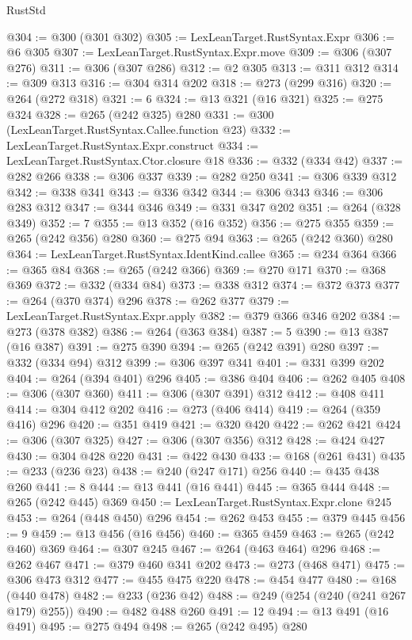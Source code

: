 \begin{lexlean}{RustStd}
\begin{coremodule}
@304 := @300 (@301 @302)
@305 := LexLeanTarget.RustSyntax.Expr
@306 := @6 @305
@307 := LexLeanTarget.RustSyntax.Expr.move
@309 := @306 (@307 @276)
@311 := @306 (@307 @286)
@312 := @2 @305
@313 := @311 @312
@314 := @309 @313
@316 := @304 @314 @202
@318 := @273 (@299 @316)
@320 := @264 (@272 @318)
@321 := 6
@324 := @13 @321 (@16 @321)
@325 := @275 @324
@328 := @265 (@242 @325) @280
@331 := @300 (LexLeanTarget.RustSyntax.Callee.function @23)
@332 := LexLeanTarget.RustSyntax.Expr.construct
@334 := LexLeanTarget.RustSyntax.Ctor.closure @18
@336 := @332 (@334 @42)
@337 := @282 @266
@338 := @306 @337
@339 := @282 @250
@341 := @306 @339 @312
@342 := @338 @341
@343 := @336 @342
@344 := @306 @343
@346 := @306 @283 @312
@347 := @344 @346
@349 := @331 @347 @202
@351 := @264 (@328 @349)
@352 := 7
@355 := @13 @352 (@16 @352)
@356 := @275 @355
@359 := @265 (@242 @356) @280
@360 := @275 @94
@363 := @265 (@242 @360) @280
@364 := LexLeanTarget.RustSyntax.IdentKind.callee
@365 := @234 @364
@366 := @365 @84
@368 := @265 (@242 @366)
@369 := @270 @171
@370 := @368 @369
@372 := @332 (@334 @84)
@373 := @338 @312
@374 := @372 @373
@377 := @264 (@370 @374) @296
@378 := @262 @377
@379 := LexLeanTarget.RustSyntax.Expr.apply
@382 := @379 @366 @346 @202
@384 := @273 (@378 @382)
@386 := @264 (@363 @384)
@387 := 5
@390 := @13 @387 (@16 @387)
@391 := @275 @390
@394 := @265 (@242 @391) @280
@397 := @332 (@334 @94) @312
@399 := @306 @397 @341
@401 := @331 @399 @202
@404 := @264 (@394 @401) @296
@405 := @386 @404
@406 := @262 @405
@408 := @306 (@307 @360)
@411 := @306 (@307 @391) @312
@412 := @408 @411
@414 := @304 @412 @202
@416 := @273 (@406 @414)
@419 := @264 (@359 @416) @296
@420 := @351 @419
@421 := @320 @420
@422 := @262 @421
@424 := @306 (@307 @325)
@427 := @306 (@307 @356) @312
@428 := @424 @427
@430 := @304 @428 @220
@431 := @422 @430
@433 := @168 (@261 @431)
@435 := @233 (@236 @23)
@438 := @240 (@247 @171) @256
@440 := @435 @438 @260
@441 := 8
@444 := @13 @441 (@16 @441)
@445 := @365 @444
@448 := @265 (@242 @445) @369
@450 := LexLeanTarget.RustSyntax.Expr.clone @245
@453 := @264 (@448 @450) @296
@454 := @262 @453
@455 := @379 @445
@456 := 9
@459 := @13 @456 (@16 @456)
@460 := @365 @459
@463 := @265 (@242 @460) @369
@464 := @307 @245
@467 := @264 (@463 @464) @296
@468 := @262 @467
@471 := @379 @460 @341 @202
@473 := @273 (@468 @471)
@475 := @306 @473 @312
@477 := @455 @475 @220
@478 := @454 @477
@480 := @168 (@440 @478)
@482 := @233 (@236 @42)
@488 := @249 (@254 (@240 (@241 @267 @179) @255))
@490 := @482 @488 @260
@491 := 12
@494 := @13 @491 (@16 @491)
@495 := @275 @494
@498 := @265 (@242 @495) @280

\end{coremodule}
\end{lexlean}
